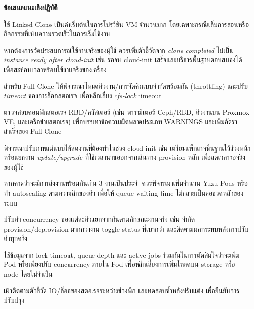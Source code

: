 \hspace*{1.3em}
\textbf{ข้อเสนอแนะเชิงปฏิบัติ}
\begin{mycustomitem}
    \item ใช้ Linked Clone เป็นค่าเริ่มต้นในการโปรวิชัน VM จํานวนมาก โดยเฉพาะกรณีแล็บการสอนหรือกิจกรรมที่เน้นความรวดเร็วในการเริ่มใช้งาน
    \item หากต้องการวัดประสบการณ์ใช้งานจริงของผู้ใช้ ควรเพิ่มตัวชี้วัดจาก \textit{clone completed} ไปเป็น \textit{instance ready after cloud-init} เช่น รอจน cloud-init เสร็จและบริการพื้นฐานตอบสนองได้ เพื่อสะท้อนเวลาพร้อมใช้งานจริงของเครื่อง
    \item สําหรับ Full Clone ให้พิจารณาโหมดคิวงาน/การจัดคิวแบบจํากัดพร้อมกัน (throttling) และปรับ \textit{timeout} ของการล็อกสตอเรจ เพื่อหลีกเลี่ยง \textit{cfs-lock} timeout
    \item ตรวจสอบคอนฟิกสตอเรจ RBD/คลัสเตอร์ (เช่น พารามิเตอร์ Ceph/RBD, คิวงานบน Proxmox VE, และเครือข่ายสตอเรจ) เพื่อบรรเทาข้อความผิดพลาดประเภท WARNINGS และเพิ่มอัตราสำเร็จของ Full Clone
    \item พิจารณาปรับภาพแม่แบบให้ลดงานที่ต้องทำในช่วง cloud-init เช่น เตรียมแพ็กเกจพื้นฐานไว้ล่วงหน้า หรือแยกงาน \textit{update/upgrade} ที่ใช้เวลานานออกจากเส้นทาง provision หลัก เพื่อลดเวลารอจริงของผู้ใช้
    \item หากคาดว่าจะมีการส่งงานพร้อมกันเกิน 3 งานเป็นประจำ ควรพิจารณาเพิ่มจำนวน Yuzu Pods หรือทำ autoscaling ตามความลึกของคิว เพื่อให้ queue waiting time ไม่กลายเป็นคอขวดหลักของระบบ
    \item ปรับค่า concurrency ของแต่ละคิวแยกจากกันตามลักษณะงานจริง เช่น จำกัด provision/deprovision มากกว่างาน toggle status ที่เบากว่า และติดตามผลกระทบหลังการปรับค่าทุกครั้ง
    \item ใช้ข้อมูลจาก lock timeout, queue depth และ active jobs ร่วมกันในการตัดสินใจว่าจะเพิ่ม Pod หรือเพียงปรับ concurrency ภายใน Pod เพื่อหลีกเลี่ยงการเพิ่มโหลดบน storage หรือ node โดยไม่จำเป็น
    \item เฝ้าติดตามตัวชี้วัด IO/ล็อกของสตอเรจระหว่างช่วงพีก และทดสอบซ้ำหลังปรับแต่ง เพื่อยืนยันการปรับปรุง
\end{mycustomitem}
